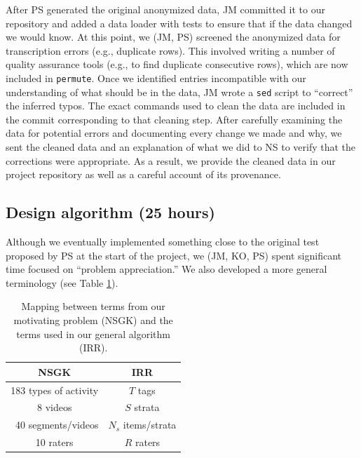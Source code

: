 \documentclass[]{article}
\begin{document}
After PS generated the original anonymized data, JM committed it to our
repository and added a data loader with tests to ensure that if the data
changed we would know.
At this point, we (JM, PS) screened the anonymized data for transcription
errors (e.g., duplicate rows).
This involved writing a number of quality assurance tools (e.g., to find
duplicate consecutive rows), which are now included in \texttt{permute}.
Once we identified entries incompatible with our understanding of what should
be in the data, JM wrote a \texttt{sed} script to ``correct'' the inferred
typos.
The exact commands used to clean the data are included in the commit
corresponding to that cleaning step.
After carefully examining the data for potential errors and documenting
every change we made and why, we sent the cleaned data and an explanation
of what we did to NS to verify that the corrections were appropriate.
As a result, we provide the cleaned data in our project repository as well
as a careful account of its provenance.

\subsection{Design algorithm (25 hours)}

Although we eventually implemented something close to the original test
proposed by PS at the start of the project, we (JM, KO, PS) spent significant
time focused on ``problem appreciation.''
We also developed a more general terminology (see Table \ref{table:mapping}).
\begin{table}[h]
\begin{center}
\begin{tabular}{ | c | c | }
  \hline
  \textbf{NSGK} & \textbf{IRR}  \\
  \hline
  183 types of activity  & $T$ tags  \\
  \hline
  8 videos  & $S$ strata   \\
  \hline
  ~40 segments/videos  & $N_s$ items/strata   \\
  \hline
  10 raters  & $R$ raters  \\
  \hline
\end{tabular}
\caption{Mapping between terms from our motivating problem (NSGK) and the terms
         used in our general algorithm (IRR).}\label{table:mapping}
\end{center}
\end{table}
\end{document}
